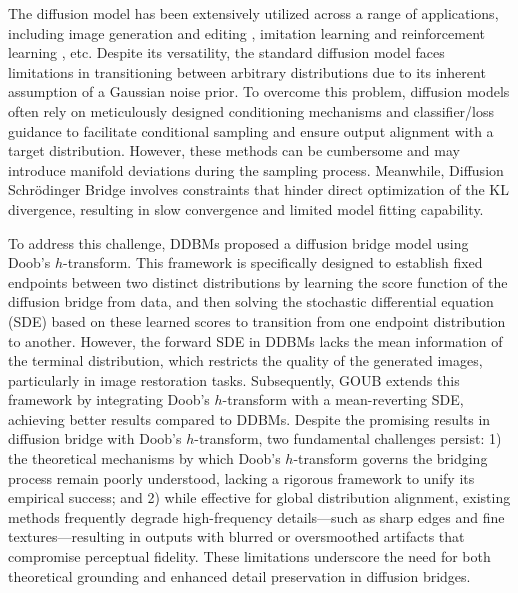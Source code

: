 
The diffusion model has been extensively utilized across a range of applications, including image generation and editing \cite{ho2020denoisingdiffusionprobabilisticmodels, DDRM, song2021scorebasedgenerativemodelingstochastic, DiffIR, li2023diffusionmodelsimagerestoration}, imitation learning \cite{afforddp, dp, 3ddp} and reinforcement learning \cite{yang2023policyrepresentationdiffusionprobability, QVPO}, etc. Despite its versatility, the standard diffusion model faces limitations in transitioning between arbitrary distributions due to its inherent assumption of a Gaussian noise prior. To overcome this problem, diffusion models \cite{dhariwal2021diffusionmodelsbeatgans, ho2022classifier,  murata2023gibbsddrmpartiallycollapsedgibbs, CCDM, chung2024diffusionposteriorsamplinggeneral, tang2024unified} often rely on meticulously designed conditioning mechanisms and classifier/loss guidance to facilitate conditional sampling and ensure output alignment with a target distribution. However, these methods can be cumbersome and may introduce manifold deviations during the sampling process. Meanwhile, Diffusion Schrödinger Bridge \cite{shi2023diffusionschrodingerbridgematching, debortoli2023diffusionschrodingerbridgeapplications, somnath2024aligneddiffusionschrodingerbridges} involves constraints that hinder direct optimization of the KL divergence, resulting in slow convergence and limited model fitting capability.




To address this challenge, DDBMs \cite{zheng2024diffusionbridgeimplicitmodels} proposed a diffusion bridge model using Doob's $h$-transform. This framework is specifically designed to establish fixed endpoints between two distinct distributions by learning the score function of the diffusion bridge from data, and then solving the stochastic differential equation (SDE) based on these learned scores to transition from one endpoint distribution to another. However, the forward SDE in DDBMs lacks the mean information of the terminal distribution, which restricts the quality of the generated images, particularly in image restoration tasks. Subsequently, GOUB \cite{yue2024imagerestorationgeneralizedornsteinuhlenbeck} extends this framework by integrating Doob's $h$-transform with a mean-reverting SDE, achieving better results compared to DDBMs. 
Despite the promising results in diffusion bridge with Doob's $h$-transform, two fundamental challenges persist: 1) the theoretical mechanisms by which Doob's $h$-transform governs the bridging process remain poorly understood, lacking a rigorous framework to unify its empirical success; and 2) while effective for global distribution alignment, existing methods frequently degrade high-frequency details—such as sharp edges and fine textures—resulting in outputs with blurred or oversmoothed artifacts that compromise perceptual fidelity. These limitations underscore the need for both theoretical grounding and enhanced detail preservation in diffusion bridges. 

